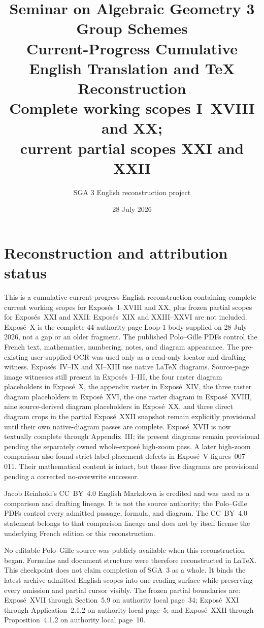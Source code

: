\documentclass[11pt,a4paper,oneside]{book}
\title{Seminar on Algebraic Geometry 3\\
  \large Group Schemes\\[0.75em]
  \normalsize Current-Progress Cumulative English Translation and
  \TeX{} Reconstruction\\
  \small Complete working scopes I--XVIII and XX;\\
  current partial scopes XXI and XXII}
\author{SGA 3 English reconstruction project}
\date{28 July 2026}
\begin{document}
\frontmatter
\maketitle

\chapter*{Reconstruction and attribution status}
This is a cumulative current-progress English reconstruction containing
complete current working scopes for Expos\'es~I--XVIII and XX,
plus frozen partial scopes for Expos\'es~XXI and XXII.
Expos\'es~XIX and XXIII--XXVI are not included. Expos\'e~X is the complete
44-authority-page Loop-1 body supplied on 28 July 2026, not a gap or an
older fragment. The published Polo--Gille PDFs control the French text,
mathematics, numbering, notes, and diagram appearance. The pre-existing
user-supplied OCR was used only as a read-only locator and drafting
witness. Expos\'es~IV--IX and XI--XIII use native \LaTeX{} diagrams.
Source-page image witnesses still present in Expos\'es~I--III, the four
raster diagram placeholders in Expos\'e~X, the appendix raster in
Expos\'e~XIV, the three raster diagram placeholders in Expos\'e~XVI,
the one raster diagram in Expos\'e~XVIII, nine source-derived diagram
placeholders in Expos\'e~XX, and three direct diagram crops in the
partial Expos\'e~XXII snapshot remain explicitly provisional until their
own native-diagram passes are complete. Expos\'e~XVII is now textually
complete through Appendix~III; its present diagrams remain provisional
pending the separately owned whole-expos\'e high-zoom pass. A later
high-zoom comparison also found strict label-placement defects in
Expos\'e~V figures~007--011. Their mathematical content is intact, but
those five diagrams are provisional pending a corrected no-overwrite
successor.

Jacob Reinhold's CC~BY~4.0 English Markdown is credited and was used as
a comparison and drafting lineage. It is not the source authority; the
Polo--Gille PDFs control every admitted passage, formula, and diagram.
The CC~BY~4.0 statement belongs to that comparison lineage and does not
by itself license the underlying French edition or this reconstruction.

No editable Polo--Gille source was publicly available when this
reconstruction began. Formulas and document structure were therefore
reconstructed in \LaTeX{}. This checkpoint does not claim completion of
SGA~3 as a whole. It binds the latest archive-admitted English scopes into
one reading surface while preserving every omission and partial cursor
visibly. The frozen partial boundaries are: Expos\'e~XVII through
Section~5.9 on authority local page~34; Expos\'e~XXI through
Application~2.1.2 on authority local page~5; and Expos\'e~XXII through
Proposition~4.1.2 on authority local page~10.
\end{document}
